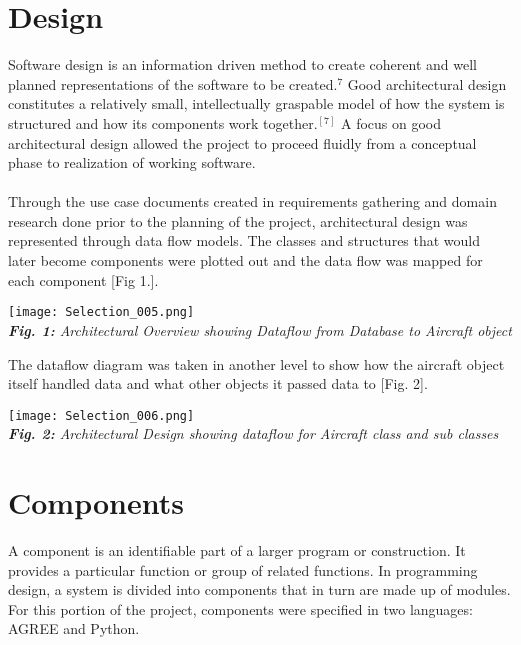 \documentclass[12pt]{report}
\theoremstyle{plain}
\theoremstyle{definition}
\begin{document}
\section*{Design}
Software design is an information driven method to create coherent and well planned representations of the software to be created.$^{7}$  Good architectural design constitutes a relatively small, intellectually graspable model of how the system is structured and how its components work together.$^[7]$  A focus on good architectural design allowed the project to proceed fluidly from a conceptual phase to realization of working software.\\
\\
Through the use case documents created in requirements gathering and domain research done prior to the planning of the project, architectural design was represented through data flow models.  The classes and structures that would later become components were plotted out and the data flow was mapped for each component [Fig 1.]. 
\begin{center}
\texttt{[image: Selection\_005.png]}\\
\footnotesize{\textit{\textbf{Fig. 1:} Architectural Overview showing Dataflow from Database to Aircraft object}}
\end{center}

The dataflow diagram was taken in another level to show how the aircraft object itself handled data and what other objects it passed data to [Fig. 2].
\begin{center}
\texttt{[image: Selection\_006.png]}\\
\footnotesize{\textit{\textbf{Fig. 2:} Architectural Design showing dataflow for Aircraft class and sub classes}}
\end{center}

\section*{Components}
A component is an identifiable part of a larger program or construction. It provides a particular function or group of related functions. In programming design, a system is divided into components that in turn are made up of modules. For this portion of the project, components were specified in two languages: AGREE and Python.
\end{document}
